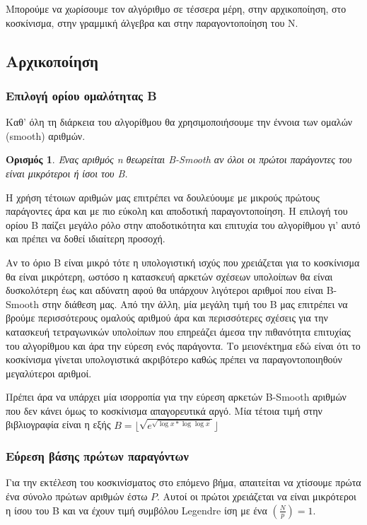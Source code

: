 \documentclass[12pt]{article}
\newtheorem{mydef}{Ορισμός}[section]
\numberwithin{equation}{section}
\begin{document}
Μπορούμε να χωρίσουμε τον αλγόριθμο σε τέσσερα μέρη, στην αρχικοποίηση, στο κοσκίνισμα, στην γραμμική άλγεβρα και στην παραγοντοποίηση του Ν.

\subsection{Αρχικοποίηση}

\subsubsection{Επιλογή ορίου ομαλότητας B}

Καθ' όλη τη διάρκεια του αλγορίθμου θα χρησιμοποιήσουμε την έννοια των ομαλών (smooth) αριθμών.
\begin{mydef}
    Ένας αριθμός n θεωρείται B-Smooth αν όλοι οι πρώτοι παράγοντες του είναι μικρότεροι ή ίσοι του B.
\end{mydef}

Η χρήση τέτοιων αριθμών μας επιτρέπει να δουλεύουμε με μικρούς πρώτους παράγοντες άρα και με πιο εύκολη και αποδοτική παραγοντοποίηση. Η επιλογή του ορίου B παίζει μεγάλο ρόλο στην αποδοτικότητα και επιτυχία του αλγορίθμου γι' αυτό και πρέπει να δοθεί ιδιαίτερη προσοχή.

Αν το όριο B είναι μικρό τότε η υπολογιστική ισχύς που χρειάζεται για το κοσκίνισμα θα είναι μικρότερη, ωστόσο η κατασκευή αρκετών σχέσεων υπολοίπων θα είναι δυσκολότερη έως και αδύνατη αφού θα υπάρχουν λιγότεροι αριθμοί που είναι B-Smooth στην διάθεση μας.
Από την άλλη, μία μεγάλη τιμή του B μας επιτρέπει να βρούμε περισσότερους ομαλούς αριθμού άρα και περισσότερες σχέσεις για την κατασκευή τετραγωνικών υπολοίπων που επηρεάζει άμεσα την πιθανότητα επιτυχίας του αλγορίθμου και άρα την εύρεση ενός παράγοντα. Το μειονέκτημα εδώ είναι ότι το κοσκίνισμα γίνεται υπολογιστικά ακριβότερο καθώς πρέπει να παραγοντοποιηθούν μεγαλύτεροι αριθμοί.

Πρέπει άρα να υπάρχει μία ισορροπία για την εύρεση αρκετών B-Smooth αριθμών που δεν κάνει όμως το κοσκίνισμα απαγορευτικά αργό. Μία τέτοια τιμή στην βιβλιογραφία είναι η εξής $B=\lfloor \sqrt{e^{\sqrt{\log x * \log \log x}}} \rfloor$

\subsubsection{Εύρεση βάσης πρώτων παραγόντων} 
Για την εκτέλεση του κοσκινίσματος στο επόμενο βήμα, απαιτείται να χτίσουμε πρώτα ένα σύνολο πρώτων αριθμών έστω $P$. Αυτοί οι πρώτοι χρειάζεται να είναι μικρότεροι η ίσου του B και να έχουν τιμή συμβόλου Legendre ίση με ένα $\left( \frac{N}{p} \right)=1 $.
\end{document}
